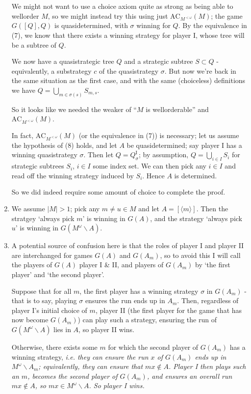\documentclass[]{article}
\newcommand{\I}{\textrm{I}}
\newcommand{\om}{\omega}
\newcommand{\lom}{{<\omega}}
\renewcommand{\ac}{\textrm{AC}}
\begin{document}
\begin{enumerate}[label = (\arabic*)]
    We might not want to use a choice axiom quite as strong as being able to wellorder $M$, so we might instead try this using just $\ac_{M^\lom}(M)$; the game $G([Q],Q)$ is quasidetermined, with $\sigma$ winning for $Q$. By the equivalence in (7), we know that there exists a winning strategy for player I, whose tree will be a subtree of $Q$.

    We now have a quasistrategic tree $Q$ and a strategic subtree $S\subset Q$ - equivalently, a substrategy $c$ of the quasistrategy $\sigma$. But now we're back in the same situation as the first case, and with the same (choiceless) definitions we have $Q = \bigcup_{m\in \sigma(s)}S_{m,s}$.
    
    So it looks like we needed the weaker of ``$M$ is wellorderable'' and $\ac_{M^\lom}(M)$.

    In fact, $\ac_{M^\lom}(M)$ (or the equivalence in (7)) is necessary; let us assume the hypothesis of (8) holds, and let $A$ be quasidetermined; say player I has a winning quasistrategy $\sigma$. Then let $Q = Q_\sigma^\I$; by assumption, $Q = \bigcup_{i \in I}S_i$ for strategic subtrees $S_i$, $i \in I$ some index set. We can then pick any $i \in I$ and read off the winning strategy induced by $S_i$. Hence $A$ is determined.

    So we did indeed require some amount of choice to complete the proof.

    \item We assume $|M| > 1$; pick any $m\ne u \in M$ and let $A = [\langle m \rangle]$. Then the stratgey `always pick $m$' is winning in $G(A)$, and the strategy `always pick $u$' is winning in $G(M^\om \backslash A)$.
    
    \item A potential source of confusion here is that the roles of player I and player II are interchanged for games $G(A)$ and $G(A_m)$, so to avoid this I will call the players of $G(A)$ player I \& II, and players of $G(A_m)$ by `the first player' and `the second player'.
    
    Suppose that for all $m$, the first player has a winning strategy $\sigma$ in $G(A_m)$ - that is to say, playing $\sigma$ ensures the run ends up in $A_m$. Then, regardless of player I's initial choice of $m$, player II (the first player for the game that has now become $G(A_m)$) can play such a strategy, ensuring the run of $G(M^\om\backslash A)$ lies in $A$, so player II wins.

    Otherwise, there exists some $m$ for which the second player of $G(A_m)$ has a winning strategy, \it{i.e.} they can ensure the run $x$ of $G(A_m)$ ends up in $M^\om\backslash A_m$; equivalently, they can ensure that $mx \not \in A$. Player I then plays such an $m$, becomes the second player of $G(A_m)$, and ensures an overall run $mx \not \in A$, so $mx \in M^\om \backslash A$. So player I wins.


\end{enumerate}
\end{document}
